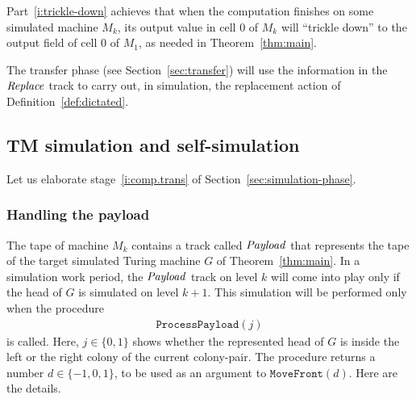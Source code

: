 \documentclass[11pt]{memoir}
\theoremstyle{definition} %
\renewcommand{\le}{\leq}
\newcommand{\fld}[1]{\ensuremath{\textit{#1\/}}}
\newcommand{\rul}[1]{\ensuremath{\texttt{#1}}}
\def\U{U}
\newcommand{\F}{F}
\newcommand{\Q}{Q} %
\newcommand{\Payload}{\fld{Payload}}
\newcommand{\Replace}{\fld{Replace}}
\newcommand{\MoveFront}{\rul{MoveFront}}
\newcommand{\ProcessPayload}{\rul{ProcessPayload}}
\newcommand{\cns}[1]{c_{\textrm{\upshape #1}}}
\newcommand{\CRedund}{\cns{redund}}
\begin{document}
Part~\ref{i:trickle-down} achieves that when the computation finishes on some
simulated machine \( M_{k} \),
its output value in cell 0 of \( M_{k} \) will ``trickle down'' to the output field of  cell 0 of \( M_{1} \),
as needed in Theorem~\ref{thm:main}.

The transfer phase (see Section~\ref{sec:transfer})
will use the information in the \( \Replace \) track to carry out, in simulation, the
replacement action of Definition~\ref{def:dictated}.





\subsection{TM simulation and self-simulation}\label{sec:self-simulation}

Let us elaborate stage~\ref{i:comp.trans} of Section~\ref{sec:simulation-phase}.

\subsubsection{Handling the payload}\label{sec:payload}

The tape of machine \( M_{k} \) contains a track called \( \Payload \) that represents the tape of
the target simulated Turing machine \( G \) of Theorem~\ref{thm:main}.
In a simulation work period, the \( \Payload \) track on level \( k \)
will come into play only if the head of \( G \) is simulated on level \( k+1 \).
This simulation will be performed only when the procedure
\begin{align*}
   \ProcessPayload(j)
\end{align*}
is called.
Here, \( j\in\{0,1\} \) shows whether the represented head of \( G \) is inside the left or the right
colony of the current colony-pair.
The procedure returns a number \( d\in\{-1,0,1\} \), to be used as an argument
to \( \MoveFront(d) \).
Here are the details.
\end{document}
